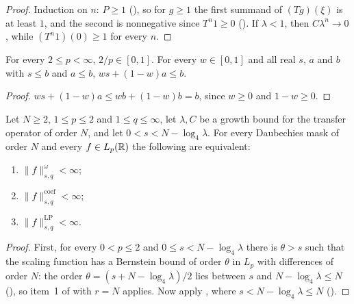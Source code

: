 \begin{proof}
\leanok
{}
Induction on $n$: $P \geq 1$ (), so for $g \geq 1$ the first summand
of $(T g)(\xi)$ is at least $1$, and the second is nonnegative since $T^n 1 \geq 0$
(). If $\lambda < 1$, then $C \lambda^n \to 0$, while
$(T^n 1)(0) \geq 1$ for every $n$.
\end{proof}

\begin{lemma}
\label{lem:daub-interpolated-orders}
\leanok
For every $2 \leq p < \infty$, $2/p \in [0, 1]$. For every $w \in [0, 1]$ and all real $s$, $a$
and $b$ with $s \leq b$ and $a \leq b$, $w s + (1 - w) a \leq b$.
\end{lemma}

\begin{proof}
\leanok
$w s + (1 - w) a \leq w b + (1 - w) b = b$, since $w \geq 0$ and $1 - w \geq 0$.
\end{proof}

\begin{corollary}
\label{cor:daub-besov-le-two}
\leanok
{}
Let $N \geq 2$, $1 \leq p \leq 2$ and $1 \leq q \leq \infty$, let $\lambda, C$ be a growth bound
for the transfer operator of order $N$, and let $0 < s < N - \log_4 \lambda$. For every Daubechies
mask of order $N$ and every $f \in L_p(\mathbb{R})$ the following are equivalent:
\begin{enumerate}
  \item $\|f\|^{\omega}_{s,q} < \infty$;
  \item $\|f\|^{\mathrm{coef}}_{s,q} < \infty$;
  \item $\|f\|^{\mathrm{LP}}_{s,q} < \infty$.
\end{enumerate}
\end{corollary}

\begin{proof}
\leanok
{}
First, for every $0 < p \leq 2$ and $0 \leq s < N - \log_4 \lambda$ there is $\theta > s$ such
that the scaling function has a Bernstein bound of order $\theta$ in $L_p$ with differences of
order $N$: the order $\theta = (s + N - \log_4 \lambda)/2$ lies between $s$ and
$N - \log_4 \lambda \leq N$ (), so item~1 of
 with $r = N$ applies. Now apply , where
$s < N - \log_4 \lambda \leq N$ ().
\end{proof}

